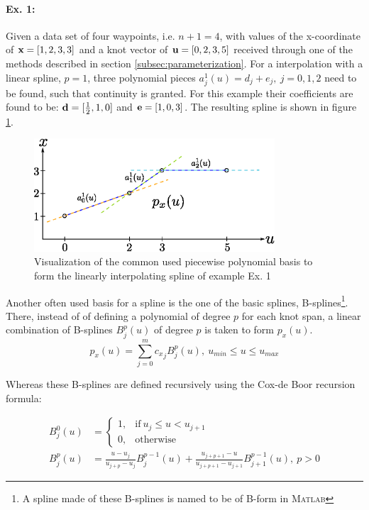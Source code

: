 \paragraph{Ex. 1:}
Given a data set of four waypoints, i.e. $n+1=4$, with values of the x-coordinate of ${\bf x} = [1,2,3,3]$ and a knot vector of ${\bf u}=[0,2,3,5]$ received through one of the methods described in section \ref{subsec:parameterization}. For a interpolation with a linear spline, $p=1$, three polynomial pieces $a_j^1(u)=d_j+e_j,~j=0,1,2$ need to be found, such that continuity is granted. For this example their coefficients are found to be: ${\bf d}=[\frac{1}{2},1,0]$ and ${\bf e}=[1,0,3]$. The resulting spline is shown in figure \ref{fig:ppSpline}.

\begin{figure}[H]
	\centering
    \includegraphics[width = 0.8\textwidth]{graphics/ppSpline.eps}
  \caption{Visualization of the common used piecewise polynomial basis to form the linearly interpolating spline of example Ex. 1}
  \label{fig:ppSpline}
\end{figure} 


Another often used basis for a spline is the one of the basic splines, B-splines\footnote{A spline made of these B-splines is named to be of B-form in \textsc{Matlab}}. There, instead of of defining a polynomial of degree $p$ for each knot span, a linear combination of B-splines $B_j^p(u)$ of degree $p$ is taken to form $p_x(u)$.
\begin{equation}
p_x(u) = \sum_{j=0}^m {c_x}_jB_j^p(u), ~u_{min} \leq u \leq u_{max}
\end{equation}

Whereas these B-splines are defined recursively using the Cox-de Boor recursion formula:
 
 \begin{align}
B_j^0(u) &= \begin{cases} 1,&\text{if}~ u_j \leq u < u_{j+1}\\
					0,&\text{otherwise}
		\end{cases}\\
B_j^p(u) &= \frac{u-u_j}{u_{j+p}-u_j}B_j^{p-1}(u)+\frac{u_{j+p+1}-u}{u_{j+p+1}-u_{j+1}}B_{j+1}^{p-1}(u), ~p>0
\end{align}

